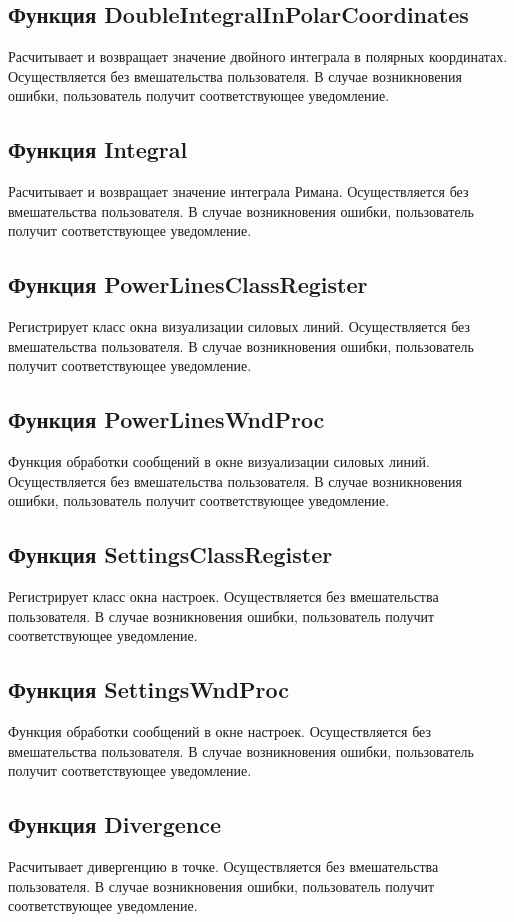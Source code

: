 \documentclass[14pt,a4paper,final]{extreport}
\begin{document}
\subsection{Функция DoubleIntegralInPolarCoordinates}
Расчитывает и возвращает значение двойного интеграла в полярных координатах. Осуществляется без вмешательства пользователя. 
В случае возникновения ошибки, пользователь получит соответствующее уведомление.

\subsection{Функция Integral}
Расчитывает и возвращает значение интеграла Римана. Осуществляется без вмешательства пользователя. 
В случае возникновения ошибки, пользователь получит соответствующее уведомление.

\subsection{Функция PowerLinesClassRegister}
Регистрирует класс окна визуализации силовых линий. Осуществляется без вмешательства пользователя. 
В случае возникновения ошибки, пользователь получит соответствующее уведомление.

\subsection{Функция PowerLinesWndProc}
Функция обработки сообщений в окне визуализации силовых линий. Осуществляется без вмешательства пользователя. 
В случае возникновения ошибки, пользователь получит соответствующее уведомление.

\subsection{Функция SettingsClassRegister}
Регистрирует класс окна настроек. Осуществляется без вмешательства пользователя. 
В случае возникновения ошибки, пользователь получит соответствующее уведомление.

\subsection{Функция SettingsWndProc}
Функция обработки сообщений в окне настроек. Осуществляется без вмешательства пользователя. 
В случае возникновения ошибки, пользователь получит соответствующее уведомление.

\subsection{Функция Divergence}
Расчитывает дивергенцию в точке. Осуществляется без вмешательства пользователя. 
В случае возникновения ошибки, пользователь получит соответствующее уведомление.
\end{document}
